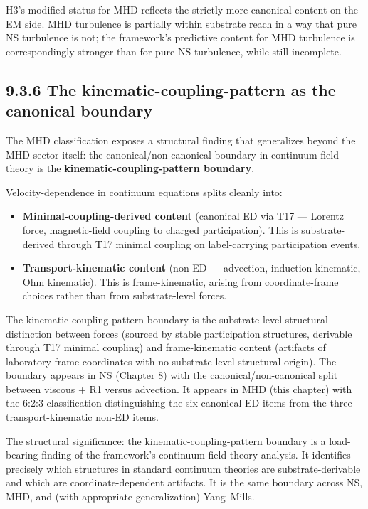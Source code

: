 \documentclass[11pt]{book}
\begin{document}
H3's modified status for MHD reflects the strictly-more-canonical content on the EM side. MHD turbulence is partially within substrate reach in a way that pure NS turbulence is not; the framework's predictive content for MHD turbulence is correspondingly stronger than for pure NS turbulence, while still incomplete.

\subsection{9.3.6 The kinematic-coupling-pattern as the canonical boundary}

The MHD classification exposes a structural finding that generalizes beyond the MHD sector itself: the canonical/non-canonical boundary in continuum field theory is the \textbf{kinematic-coupling-pattern boundary}.

Velocity-dependence in continuum equations splits cleanly into:
\begin{itemize}
\item \textbf{Minimal-coupling-derived content} (canonical ED via T17 — Lorentz force, magnetic-field coupling to charged participation). This is substrate-derived through T17 minimal coupling on label-carrying participation events.
\item \textbf{Transport-kinematic content} (non-ED — advection, induction kinematic, Ohm kinematic). This is frame-kinematic, arising from coordinate-frame choices rather than from substrate-level forces.
\end{itemize}

The kinematic-coupling-pattern boundary is the substrate-level structural distinction between forces (sourced by stable participation structures, derivable through T17 minimal coupling) and frame-kinematic content (artifacts of laboratory-frame coordinates with no substrate-level structural origin). The boundary appears in NS (Chapter 8) with the canonical/non-canonical split between viscous + R1 versus advection. It appears in MHD (this chapter) with the 6:2:3 classification distinguishing the six canonical-ED items from the three transport-kinematic non-ED items.

The structural significance: the kinematic-coupling-pattern boundary is a load-bearing finding of the framework's continuum-field-theory analysis. It identifies precisely which structures in standard continuum theories are substrate-derivable and which are coordinate-dependent artifacts. It is the same boundary across NS, MHD, and (with appropriate generalization) Yang–Mills.
\end{document}
